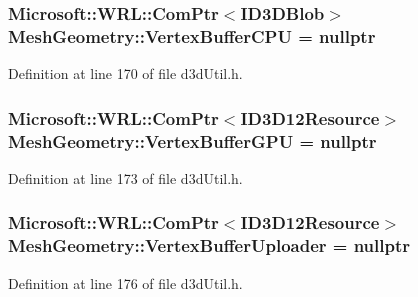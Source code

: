 \subsubsection[{\texorpdfstring{Vertex\+Buffer\+C\+PU}{VertexBufferCPU}}]{\setlength{\rightskip}{0pt plus 5cm}Microsoft\+::\+W\+R\+L\+::\+Com\+Ptr$<$I\+D3\+D\+Blob$>$ Mesh\+Geometry\+::\+Vertex\+Buffer\+C\+PU = nullptr}\hypertarget{struct_mesh_geometry_a79e5e540605f4205197154469bf4194e_a79e5e540605f4205197154469bf4194e}{}\label{struct_mesh_geometry_a79e5e540605f4205197154469bf4194e_a79e5e540605f4205197154469bf4194e}


Definition at line 170 of file d3d\+Util.\+h.

\subsubsection[{\texorpdfstring{Vertex\+Buffer\+G\+PU}{VertexBufferGPU}}]{\setlength{\rightskip}{0pt plus 5cm}Microsoft\+::\+W\+R\+L\+::\+Com\+Ptr$<$I\+D3\+D12\+Resource$>$ Mesh\+Geometry\+::\+Vertex\+Buffer\+G\+PU = nullptr}\hypertarget{struct_mesh_geometry_afc3be274ba79e6984225407560350438_afc3be274ba79e6984225407560350438}{}\label{struct_mesh_geometry_afc3be274ba79e6984225407560350438_afc3be274ba79e6984225407560350438}


Definition at line 173 of file d3d\+Util.\+h.

\subsubsection[{\texorpdfstring{Vertex\+Buffer\+Uploader}{VertexBufferUploader}}]{\setlength{\rightskip}{0pt plus 5cm}Microsoft\+::\+W\+R\+L\+::\+Com\+Ptr$<$I\+D3\+D12\+Resource$>$ Mesh\+Geometry\+::\+Vertex\+Buffer\+Uploader = nullptr}\hypertarget{struct_mesh_geometry_a99726cbb8b6acc9599ccaae768032104_a99726cbb8b6acc9599ccaae768032104}{}\label{struct_mesh_geometry_a99726cbb8b6acc9599ccaae768032104_a99726cbb8b6acc9599ccaae768032104}


Definition at line 176 of file d3d\+Util.\+h.


